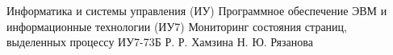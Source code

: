 \documentclass{bmstu}
\begin{document}
\makecourseworktitle
	{Информатика и системы управления (ИУ)}
	{Программное обеспечение ЭВМ и информационные технологии (ИУ7)}
	{Мониторинг состояния страниц,\\выделенных процессу}
	{ИУ7-73Б}
	{Р. Р. Хамзина}
	{Н. Ю. Рязанова}{}{}



\maketableofcontents








\makebibliography
\end{document}
